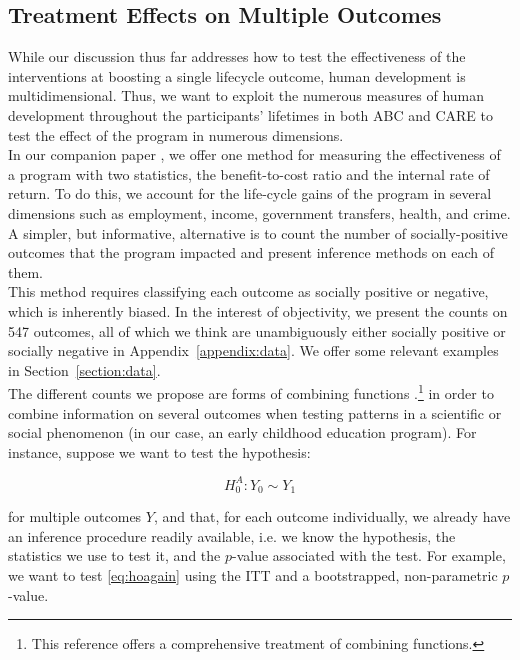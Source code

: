 \subsection{Treatment Effects on Multiple Outcomes}

\noindent While our discussion thus far addresses how to test the effectiveness of the interventions at boosting a single lifecycle outcome, human development is multidimensional. Thus, we want to exploit the numerous measures of human development throughout the participants' lifetimes in both ABC and CARE to test the effect of the program in numerous dimensions. \\

\noindent In our companion paper \citep{Elango_et_al_2015_ABC_unpublished}, we offer one method for measuring the effectiveness of a program with two statistics, the benefit-to-cost ratio and the internal rate of return. To do this, we account for the life-cycle gains of the program in several dimensions such as employment, income, government transfers, health, and crime. A simpler, but informative, alternative is to count the number of socially-positive outcomes that the program  impacted and present inference methods on each of them.\\

\noindent This method requires classifying each outcome as socially positive or negative, which is inherently biased. In the interest of objectivity, we present the counts on 547 outcomes, all of which we think are unambiguously either socially positive or socially negative in Appendix~\ref{appendix:data}. We offer some relevant examples in Section~\ref{section:data}.\\

\noindent The different counts we propose are forms of combining functions \citep{Pesarin_Salmaso_2010_PermutationTests}.\footnote{This reference offers a comprehensive treatment of combining functions.} in order to combine information on several outcomes when testing patterns in a scientific or social phenomenon (in our case, an early childhood education program). For instance, suppose we want to test the hypothesis: 

\begin{equation}
H_{0}^A: Y_{0} \sim Y_{1} \label{eq:hoagain}
\end{equation}

\noindent for multiple outcomes $Y$, and that, for each outcome individually, we already have an inference procedure readily available, i.e. we know the hypothesis, the statistics we use to test it, and the $p$-value associated with the test. For example, we want to test \eqref{eq:hoagain} using the ITT and a bootstrapped, non-parametric $p$-value.\\

